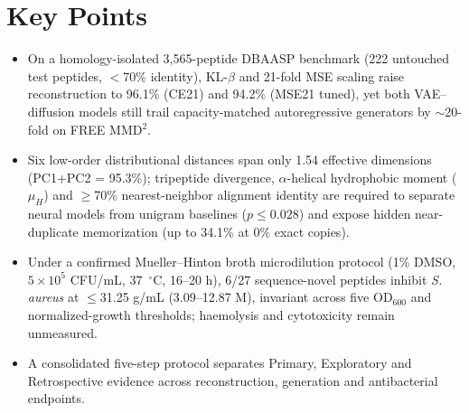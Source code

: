 \documentclass[unnumsec,webpdf,contemporary,large]{oup-authoring-template}
\newcommand{\rev}[1]{#1}
\begin{document}
\noindent\begin{minipage}{\columnwidth}
\section*{Key Points}
\begin{itemize}
\item \rev{On a homology-isolated 3,565-peptide DBAASP benchmark (222 untouched test peptides, $<$70\% identity), KL-$\beta$ and 21-fold MSE scaling raise reconstruction to 96.1\% (CE21) and 94.2\% (MSE21 tuned), yet both VAE--diffusion models still trail capacity-matched autoregressive generators by $\sim$20-fold on FREE MMD$^2$.}
\item \rev{Six low-order distributional distances span only 1.54 effective dimensions (PC1+PC2 = 95.3\%); tripeptide divergence, $\alpha$-helical hydrophobic moment ($\mu_H$) and $\geq$70\% nearest-neighbor alignment identity are required to separate neural models from unigram baselines ($p\leq 0.028$) and expose hidden near-duplicate memorization (up to 34.1\% at 0\% exact copies).}
\item \rev{Under a confirmed Mueller--Hinton broth microdilution protocol (1\% DMSO, $5\times 10^5$ CFU/mL, 37~$^\circ$C, 16--20 h), 6/27 sequence-novel peptides inhibit \textit{S. aureus} at $\leq$31.25 \textmu{}g/mL (3.09--12.87 \textmu{}M), invariant across five OD$_{600}$ and normalized-growth thresholds; haemolysis and cytotoxicity remain unmeasured.}
\item \rev{A consolidated five-step protocol separates Primary, Exploratory and Retrospective evidence across reconstruction, generation and antibacterial endpoints.}
\end{itemize}
\end{minipage}
\end{document}
